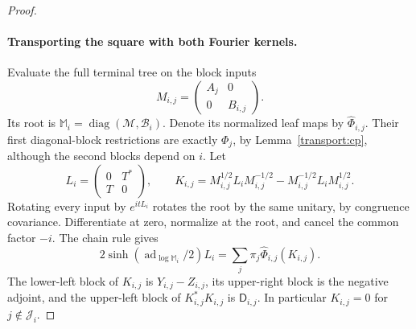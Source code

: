 \begin{proof}
\paragraph{Transporting the square with both Fourier kernels.}
Evaluate the full terminal tree on the block inputs
\[
 M_{i,j}=\begin{pmatrix}A_j&0\\0&B_{i,j}\end{pmatrix}.
\]
Its root is
$\mathbb M_i=\operatorname{diag}(\mathcal M,\mathcal B_i)$.
Denote its normalized leaf maps by $\widehat\Phi_{i,j}$.  Their first
diagonal-block restrictions are exactly $\Phi_j$, by
Lemma~\ref{transport:cp}, although the second blocks depend on $i$.
Let
\[
 L_i=\begin{pmatrix}0&T^*\\T&0\end{pmatrix},\qquad
 K_{i,j}=M_{i,j}^{1/2}L_iM_{i,j}^{-1/2}
              -M_{i,j}^{-1/2}L_iM_{i,j}^{1/2}.
\]
Rotating every input by $e^{itL_i}$ rotates the root by the same unitary,
by congruence covariance.  Differentiate at zero, normalize at the
root, and cancel the common factor $-i$.  The chain rule gives
\begin{equation}\label{transport:block-rotation}
 2\sinh(\operatorname{ad}_{\log\mathbb M_i}/2)L_i
 =\sum_j\pi_j\widehat\Phi_{i,j}(K_{i,j}).
\end{equation}
The lower-left block of $K_{i,j}$ is $Y_{i,j}-Z_{i,j}$, its upper-right
block is the negative adjoint, and the upper-left block of
$K_{i,j}^*K_{i,j}$ is $\mathsf D_{i,j}$.  In particular
$K_{i,j}=0$ for $j\notin\mathcal J_i$.


\end{proof}
